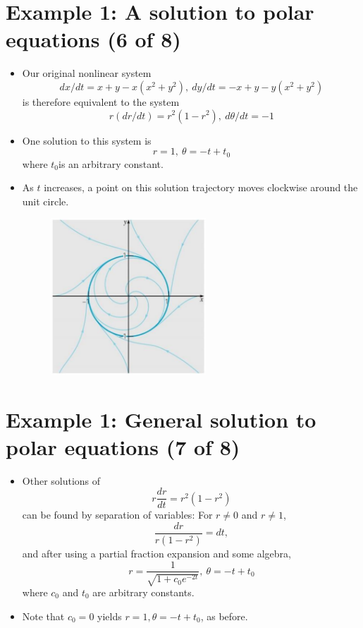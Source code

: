 \documentclass[11pt,a4paper]{article}
\begin{document}
	\section*{Example 1: A solution to polar equations (6 of 8)}
	\begin{itemize}
		\item Our original nonlinear system
		$$
		dx/dt = x+y-x(x^2+y^2),\ dy/dt = -x+y-y(x^2+y^2)
		$$
		is therefore equivalent to the system
		$$
		r(dr/dt) = r^2(1-r^2),\ d\theta/dt = -1
		$$
		\item One solution to this system is
		$$
		r = 1,\ \theta = -t+t_0
		$$
		where $t_0$is an arbitrary constant.
		\item As $t$ increases, a point on this solution trajectory moves clockwise around the  unit circle.
		\begin{figure}[H]
			\centering
			\includegraphics[width=0.55\textwidth]{figure/Lec19f5.PNG}
		\end{figure}
	\end{itemize}
	\section*{Example 1: General solution to polar equations (7 of 8)}
	\begin{itemize}
		\item Other solutions of 
		$$
		r\frac{dr}{dt} = r^2(1-r^2)
		$$
		can be found by separation of variables: For $r \neq 0$ and $r \neq 1$,
		$$
		\frac{dr}{r(1-r^2)} = dt,
		$$
		and after using a partial fraction expansion and some algebra,
		$$
		r = \frac{1}{\sqrt{1+c_0e^{-2t}}},\ \theta = -t + t_0
		$$
		where $c_0$ and $t_0$ are arbitrary constants.
		\item Note that $c_0 = 0$ yields $r = 1, \theta = -t + t_0$, as before.
	\end{itemize}
\end{document}
